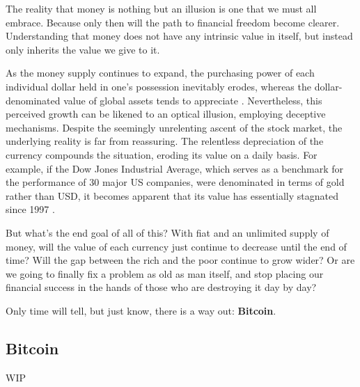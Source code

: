 The reality that money is nothing but an illusion is one that we must all embrace. Because only then will the path to financial freedom become
clearer. Understanding that money does not have any intrinsic value in itself, but instead only inherits the value we give to it.

As the money supply continues to expand, the purchasing power of each individual dollar held in one's possession inevitably erodes, whereas the dollar-denominated value of global assets tends to appreciate \cite{moneyprinting}. Nevertheless, this perceived growth can be likened to an optical illusion, employing deceptive mechanisms. Despite the seemingly unrelenting ascent of the stock market, the underlying reality is far from reassuring. The relentless depreciation of the currency compounds the situation, eroding its value on a daily basis. For example, if the Dow Jones Industrial Average, which serves as a benchmark for the performance of 30 major US companies, were denominated in terms of gold rather than USD, it becomes apparent that its value has essentially stagnated since 1997 \cite{stockmarketillusion}.

But what's the end goal of all of this? With fiat and an unlimited supply of money, will the value of each currency just continue to decrease until
the end of time? Will the gap between the rich and the poor continue to grow wider? Or are we going to finally fix a problem as old as man itself, and
stop placing our financial success in the hands of those who are destroying it day by day?

Only time will tell, but just know, there is a way out: \textbf{Bitcoin}.

\subsection{Bitcoin}
WIP
